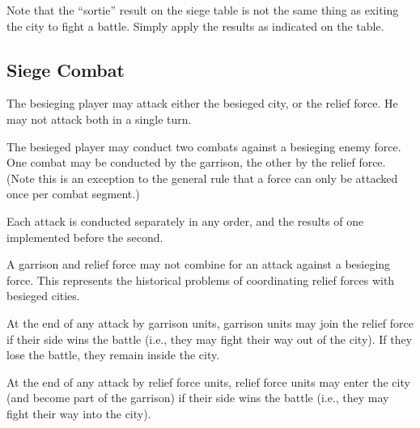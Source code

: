 Note that the “sortie” result on the siege table is not the same thing as exiting the city to fight a battle. Simply apply the results as indicated on the table.

\subsection{Siege Combat}

The besieging player may attack either the besieged city, or the relief force. He may not attack both in a single turn.

The besieged player may conduct two combats against a besieging enemy force. One combat may be conducted by the garrison, the other by the relief force. (Note this is an exception to the general rule that a force can only be attacked once per combat segment.)

Each attack is conducted separately in any order, and the results of one implemented before the second.

A garrison and relief force may not combine for an attack against a besieging force. This represents the historical problems of coordinating relief forces with besieged cities.

At the end of any attack by garrison units, garrison units may join the relief force if their side wins the battle (i.e., they may fight their way out of the city). If they lose the battle, they remain inside the city.

At the end of any attack by relief force units, relief force units may enter the city (and become part of the garrison) if their side wins the battle (i.e., they may fight their way into the city).
